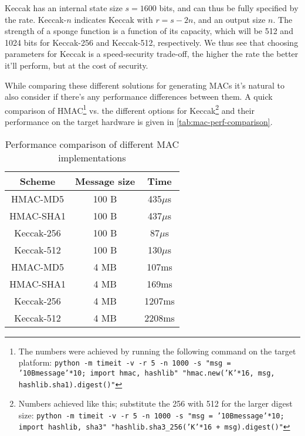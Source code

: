 Keccak has an internal state size $s=1600$ bits, and can thus be fully specified by the rate. Keccak-$n$ indicates Keccak with $r=s-2n$, and an output size $n$. The strength of a sponge function is a function of its capacity, which will be 512 and 1024 bits for Keccak-256 and Keccak-512, respectively. We thus see that choosing parameters for Keccak is a speed-security trade-off, the higher the rate the better it'll perform, but at the cost of security.

While comparing these different solutions for generating MACs it's natural to also consider if there's any performance differences between them. A quick comparison of HMAC\footnote{The numbers were achieved by running the following command on the target platform: \texttt{python -m timeit -v -r 5 -n 1000 -s "msg = '10Bmessage'*10; import hmac, hashlib" "hmac.new('K'*16, msg, hashlib.sha1).digest()"}} vs. the different options for Keccak\footnote{Numbers achieved like this; substitute the 256 with 512 for the larger digest size: \texttt{python -m timeit -v -r 5 -n 1000 -s "msg = '10Bmessage'*10; import hashlib, sha3" "hashlib.sha3\_256('K'*16 + msg).digest()"}} and their performance on the target hardware is given in \autoref{tab:mac-perf-comparison}.

\begin{table}[ht!]
\caption{Performance comparison of different MAC implementations}\label{tab:mac-perf-comparison}
\centering
    \begin{tabular}{| c | c | c |}
    \hline
    \textbf{Scheme} & \textbf{Message size} & \textbf{Time} \\ \hline
    HMAC-MD5 & 100 B & 435$\mu$s \\ \hline
    HMAC-SHA1 & 100 B & 437$\mu$s \\ \hline
    Keccak-256 & 100 B & 87$\mu$s \\ \hline
    Keccak-512 & 100 B & 130$\mu$s \\ \hline
    HMAC-MD5 & 4 MB & 107ms \\ \hline
    HMAC-SHA1 & 4 MB & 169ms \\ \hline
    Keccak-256 & 4 MB & 1207ms \\ \hline
    Keccak-512 & 4 MB & 2208ms \\ \hline
    \end{tabular}
\end{table}

